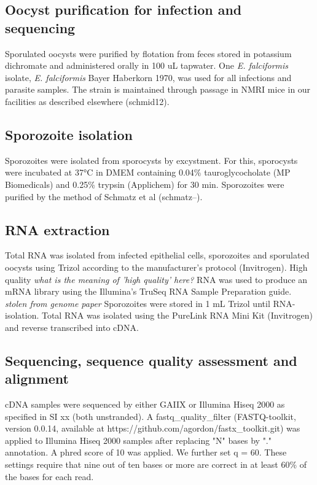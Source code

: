 \documentclass{bmcart}
\begin{document}
\subsection{Oocyst purification for infection and sequencing}
Sporulated oocysts were purified by flotation from feces stored in
potassium dichromate and administered orally in 100 uL tapwater. One
\textit{E. falciformis} isolate, \textit{E. falciformis} Bayer
Haberkorn 1970, was used for all infections and parasite samples. The
strain is maintained through passage in NMRI mice in our facilities as
described elsewhere (schmid12).

\subsection{Sporozoite isolation}
Sporozoites were isolated from sporocysts by excystment. For this,
sporocysts were incubated at 37$°$C in DMEM containing 0.04\%
tauroglycocholate (MP Biomedicals) and 0.25\% trypsin (Applichem) for
30 min. Sporozoites were purified by the method of Schmatz et al
(schmatz--).

\subsection{RNA extraction}
Total RNA was isolated from infected epithelial cells, sporozoites and
sporulated oocysts using Trizol according to the manufacturer’s
protocol (Invitrogen). High quality \emph{what is the meaning of 'high
  quality' here?}  RNA was used to produce an mRNA library using the
Illumina’s TruSeq RNA Sample Preparation guide.  \emph{stolen from
  genome paper} Sporozoites were stored in 1 mL Trizol until
RNA-isolation.  Total RNA was isolated using the PureLink RNA Mini Kit
(Invitrogen) and reverse transcribed into cDNA.

\subsection{Sequencing, sequence quality assessment and alignment}
cDNA samples were sequenced by either GAIIX or Illumina Hiseq 2000 as
specified in SI xx (both unstranded). A fastq\_quality\_filter
(FASTQ-toolkit, version 0.0.14, available at
https://github.com/agordon/fastx\_toolkit.git) was applied to Illumina
Hiseq 2000 samples after replacing "N" bases by "." annotation.  A
phred score of 10 was applied. We further set q = 60. These settings
require that nine out of ten bases or more are correct in at least
60\% of the bases for each read.
\end{document}
